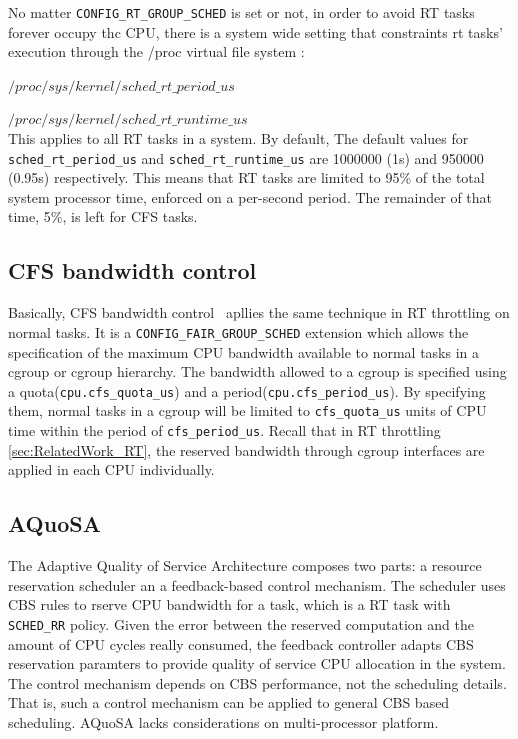 No matter \texttt{CONFIG\_RT\_GROUP\_SCHED} is set or not, in order to avoid RT 
tasks forever occupy thc CPU, there is a system wide setting that constraints
rt tasks' execution through the /proc virtual file system :

	$/proc/sys/kernel/sched\_rt\_period\_us$ 

	$/proc/sys/kernel/sched\_rt\_runtime\_us$ 
\\This applies to all RT tasks in a system. By default, 
The default values for \texttt{sched\_rt\_period\_us} and
\texttt{sched\_rt\_runtime\_us} are 1000000 (1s) and 950000 (0.95s)
respectively. This means that RT tasks are limited to 95\% of the total
system processor time, enforced on a per-second period. The remainder 
of that time, 5\%, is left for CFS tasks. 

\subsection{CFS bandwidth control\label{sec:RelatedWork_CFS}}

Basically, CFS bandwidth control~\cite{cfs-bwc} apllies the same technique 
in RT throttling on normal tasks. It is a \texttt{CONFIG\_FAIR\_GROUP\_SCHED} 
extension which allows the specification of the maximum CPU bandwidth
available to normal tasks in a cgroup or cgroup hierarchy.
The bandwidth allowed to a cgroup is specified using a 
quota(\texttt{cpu.cfs\_quota\_us}) and a period(\texttt{cpu.cfs\_period\_us}).
By specifying them, normal tasks in a cgroup will be limited to 
\texttt{cfs\_quota\_us} units of CPU time within the period of 
\texttt{cfs\_period\_us}. Recall that in RT throttling \ref{sec:RelatedWork_RT},
the reserved bandwidth through cgroup interfaces are applied in each CPU
individually.

\subsection{AQuoSA\label{sec:RelatedWork_AQuoSA}}

The Adaptive Quality of Service Architecture composes two parts: 
a resource reservation scheduler an a feedback-based
control mechanism. The scheduler uses CBS rules to rserve CPU bandwidth for
a task, which is a RT task with \texttt{SCHED\_RR} policy.
Given the error between the reserved computation and the amount of CPU cycles
really consumed, the feedback controller adapts CBS reservation paramters to
provide quality of service CPU allocation in the system.
The control mechanism depends on CBS performance, not the scheduling details.
That is, such a control mechanism can be applied to general CBS based 
scheduling. AQuoSA lacks considerations on multi-processor platform.
  
